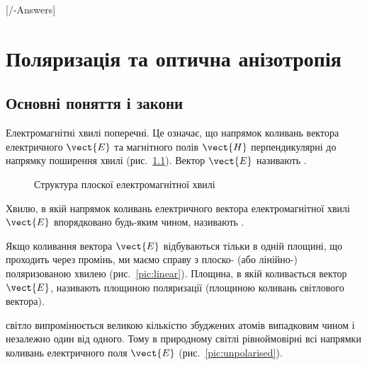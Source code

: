
[\currfilebase/\currfilebase-Answers]
\chapter{Поляризація та оптична анізотропія}\label{\currfilebase}
\makeatletter
{}
\makeatother

\let\tss\textsuperscript %

\section{Основні поняття і закони}

Електромагнітні хвилі поперечні. Це означає, що напрямок коливань вектора електричного $ \vect{E} $ та магнітного полів $ \vect{H} $ перпендикулярні до напрямку поширення хвилі (рис.~\ref{pic:EM_wave}). Вектор $ \vect{E} $ називають .


\begin{figure}[h!]\centering

\caption{Структура плоскої електромагнітної хвилі}
\label{pic:EM_wave}
\end{figure}



Хвилю, в якій напрямок коливань електричного вектора електромагнітної хвилі $ \vect{E} $ впорядковано будь-яким чином, називають .

Якщо коливання вектора $ \vect{E} $ відбуваються
тільки в одній площині, що проходить через промінь, ми маємо
справу з плоско- (або лінійно-) поляризованою хвилею (рис.~\ref{pic:linear}). Площина, в якій коливається вектор $ \vect{E} $, називають площиною
поляризації (площиною коливань світлового вектора).

 світло випромінюється великою кількістю збуджених атомів  випадковим чином і незалежно один від одного. Тому в природному світлі рівноймовірні всі напрямки коливань електричного поля $ \vect{E} $ (рис.~\ref{pic:unpolarised}).


